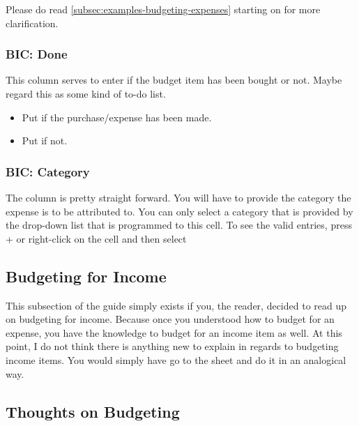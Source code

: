 Please do read \autoref{subsec:examples-budgeting-expenses} starting on  for more clarification.

\subsubsection{BIC: Done}
\label{subsubsec:budgeting-item-column-budgeted}

This column serves to enter if the budget item has been bought or not.
Maybe regard this as some kind of to-do list.
\begin{itemize}
	\item Put  if the purchase/expense has been made.
	\item Put  if not.
\end{itemize}

\subsubsection{BIC: Category}
\label{subsubsec:budgeting-item-column-category}

The column  is pretty straight forward.
You will have to provide the category the expense is to be attributed to.
You can only select a category that is provided by the drop-down list that is programmed to this cell.
To see the valid entries, press +\keystroke{\( \downarrow \)} or right-click on the cell and then select 

\subsection{Budgeting for Income}
\label{subsec:budgeting-income}

This subsection of the guide simply exists if you, the reader, decided to read up on budgeting for income.
Because once you understood how to budget for an expense, you have the knowledge to budget for an income item as well.
At this point, I do not think there is anything new to explain in regards to budgeting income items.
You would simply have go to the sheet  and do it in an analogical way.

\subsection{Thoughts on Budgeting}
\label{subsec:thoughts-on-budgeting}


